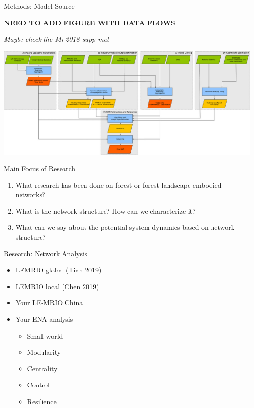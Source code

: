 \documentclass[ignorenonframetext,]{beamer}
\providecommand{\tightlist}{%
  \setlength{\itemsep}{0pt}\setlength{\parskip}{0pt}}
\begin{document}
\begin{frame}{Methods: Model Source}
\protect\hypertarget{methods-model-source}{}

\textbf{NEED TO ADD FIGURE WITH DATA FLOWS}

\emph{Maybe check the Mi 2018 supp mat}

\begin{center}\includegraphics[width=0.5\linewidth]{images/exiobase3} \end{center}

\end{frame}

\begin{frame}{Main Focus of Research}
\protect\hypertarget{main-focus-of-research}{}

\begin{enumerate}
\tightlist
\item
  What research has been done on forest or forest landscape embodied
  networks?
\item
  What is the network structure? How can we characterize it?
\item
  What can we say about the potential system dynamics based on network
  structure?
\end{enumerate}

\end{frame}

\begin{frame}{Research: Network Analysis}
\protect\hypertarget{research-network-analysis}{}

\begin{itemize}
\tightlist
\item
  LEMRIO global (Tian 2019)
\item
  LEMRIO local (Chen 2019)
\item
  Your LE-MRIO China
\item
  Your ENA analysis

  \begin{itemize}
  \tightlist
  \item
    Small world
  \item
    Modularity
  \item
    Centrality
  \item
    Control
  \item
    Resilience
  \end{itemize}
\end{itemize}

\end{frame}
\end{document}
